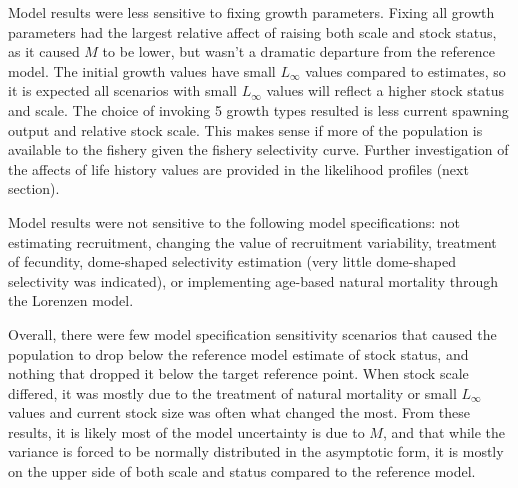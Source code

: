 \documentclass[11pt,
  english,
  a4paper,
]{article}
\begin{document}
\leavevmode\tagmcend\tagstructend\par


Model results were less sensitive to fixing growth parameters. Fixing all growth parameters had the largest relative affect of raising both scale and stock status, as it caused {\(M\)\leavevmode\tagmcend\tagstructend} to be lower, but wasn't a dramatic departure from the reference model. The initial growth values have small {\(L_{\infty}\)\leavevmode\tagmcend\tagstructend} values compared to estimates, so it is expected all scenarios with small {\(L_{\infty}\)\leavevmode\tagmcend\tagstructend} values will reflect a higher stock status and scale. The choice of invoking 5 growth types resulted is less current spawning output and relative stock scale. This makes sense if more of the population is available to the fishery given the fishery selectivity curve. Further investigation of the affects of life history values are provided in the likelihood profiles (next section).

\leavevmode\tagmcend\tagstructend\par


Model results were not sensitive to the following model specifications: not estimating recruitment, changing the value of recruitment variability, treatment of fecundity, dome-shaped selectivity estimation (very little dome-shaped selectivity was indicated), or implementing age-based natural mortality through the Lorenzen model.

\leavevmode\tagmcend\tagstructend\par


Overall, there were few model specification sensitivity scenarios that caused the population to drop below the reference model estimate of stock status, and nothing that dropped it below the target reference point. When stock scale differed, it was mostly due to the treatment of natural mortality or small {\(L_{\infty}\)\leavevmode\tagmcend\tagstructend} values and current stock size was often what changed the most. From these results, it is likely most of the model uncertainty is due to {\(M\)\leavevmode\tagmcend\tagstructend}, and that while the variance is forced to be normally distributed in the asymptotic form, it is mostly on the upper side of both scale and status compared to the reference model.
\end{document}
